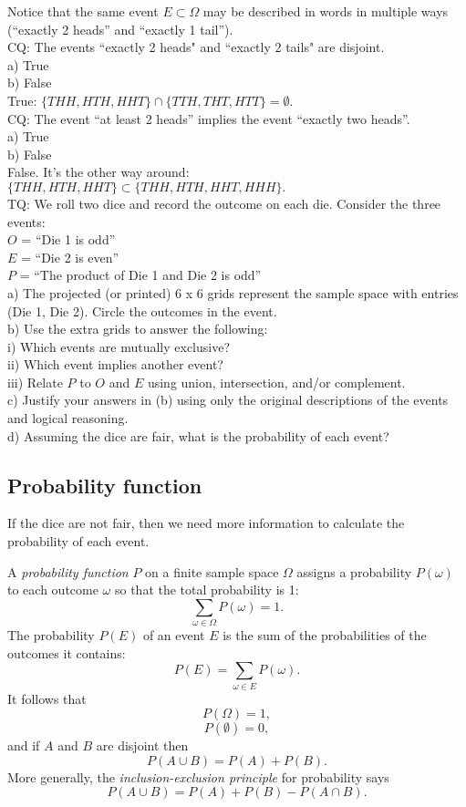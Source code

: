 Notice that the same event $E \subset \Omega$ may be described in words in multiple ways (``exactly 2 heads'' and ``exactly 1 tail'').\\

CQ: The events ``exactly 2 heads" and ``exactly 2 tails" are disjoint. \\
a) True \\
b) False \\
True: $\{THH, HTH, HHT\} \cap \{TTH, THT, HTT\} = \emptyset.$ \\

CQ: The event ``at least 2 heads'' implies the event ``exactly two heads''. \\
a) True \\
b) False \\
False.  It's the other way around: $\{THH, HTH, HHT\} \subset \{THH, HTH, HHT, HHH\}.$  \\

TQ: We roll two dice and record the outcome on each die.  Consider the three events: \\
$O$ = ``Die 1 is odd'' \\
$E$ = ``Die 2 is even'' \\
$P$ = ``The product of Die 1 and Die 2 is odd'' \\
a) The projected (or printed) 6 x 6 grids represent the sample space with entries (Die 1, Die 2).  Circle the outcomes in the event. \\
b) Use the extra grids to answer the following:\\
i) Which events are mutually exclusive?\\
ii) Which event implies another event?\\
iii) Relate $P$ to $O$ and $E$ using union, intersection, and/or complement.\\
c) Justify your answers in (b) using only the original descriptions of the events and logical reasoning. \\
d) Assuming the dice are fair, what is the probability of each event?

\subsection{Probability function}

If the dice are not fair, then we need more information to calculate the probability of each event.

A {\em probability function} $P$ on a finite sample space $\Omega$ assigns a probability $P(\omega)$ to each outcome $\omega$ so that the total probability is 1:
$$\sum_{\omega\in\Omega} P(\omega) = 1.$$
The probability $P(E)$ of an event $E$ is the sum of the probabilities of the outcomes it contains:
$$P(E) = \sum_{\omega \in E} P(\omega).$$
It follows that $$P(\Omega) = 1,$$ $$P(\emptyset) = 0,$$ and if $A$ and $B$ are disjoint then $$P(A \cup B) = P(A) + P(B).$$
More generally, the {\em inclusion-exclusion principle} for probability says
$$P(A \cup B) = P(A) + P(B) - P(A \cap B).$$

